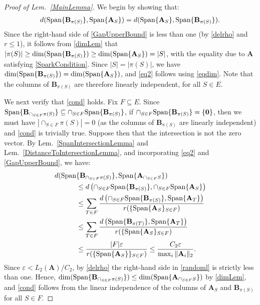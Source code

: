 \documentclass[9pt,twocolumn]{pnas-new}
\begin{document}
\begin{proof}[Proof of Lem.~\ref{MainLemma}]
We begin by showing that: 
\begin{align}\label{eq2}
d(\text{\rm Span}\{\mathbf{B}_{\pi(S)}\}, \text{\rm Span}\{\mathbf{A}_S\} ) = d(\text{\rm Span}\{\mathbf{A}_S\}, \text{\rm Span}\{\mathbf{B}_{\pi(S)}\}).
\end{align}
Since the right-hand side of \eqref{GapUpperBound} is less than one (by \eqref{delrho} and $r \leq 1$), it follows from \eqref{dimLem} that $|\pi(S)| \geq \dim(\text{\rm Span}\{\mathbf{B}_{\pi(S)}\}) \geq \dim(\text{\rm Span}\{\mathbf{A}_{S}\}) = |S|$, with the equality due to $\mathbf{A}$ satisfying \eqref{SparkCondition}. Since $|S| = |\pi(S)|$, we have $\dim(\text{\rm Span}\{\mathbf{B}_{\pi(S)}\}) = \dim(\text{\rm Span}\{\mathbf{A}_{S}\})$, and \eqref{eq2} follows using \eqref{eqdim}. Note that the columns of $\mathbf{B}_{\pi(S)}$ are therefore linearly independent, for all $S \in E$.

We next verify that \eqref{cond} holds.  Fix $F \subseteq E$. Since $\text{\rm Span}\{\mathbf{B}_{\cap_{S \in F}\pi(S)}\} \subseteq \cap_{S \in F} \text{\rm Span}\{\mathbf{B}_{\pi(S)}\}$, if $\cap_{S \in F} \text{\rm Span}\{\mathbf{B}_{\pi(S)}\} = \{\textbf{0}\}$, then we must have $|\cap_{S \in F} \pi(S)| = 0$ (as the columns of $\mathbf{B}_{\pi(S)}$ are linearly independent) and \eqref{cond} is trivially true. Suppose then that the intersection is not the zero vector. By Lem.~\ref{SpanIntersectionLemma} and Lem.~\ref{DistanceToIntersectionLemma}, and incorporating \eqref{eq2} and \eqref{GapUpperBound}, we have:
\begin{align}\label{randoml}
d( \text{\rm Span}&\{\mathbf{B}_{\cap_{S \in F}\pi(S)}\}, \text{\rm Span}\{\mathbf{A}_{\cap_{S \in F} S}\}  ) \nonumber \\
&\leq d\left( \cap_{S \in F} \text{\rm Span}\{\mathbf{B}_{\pi(S)}\}, \cap_{S \in F} \text{\rm Span}\{\mathbf{A}_{S}\} \right) \nonumber \\
&\leq \sum_{T \in F} \frac{ d\left( \cap_{S \in F} \text{\rm Span}\{\mathbf{B}_{\pi(S)}\},\text{\rm Span}\{\mathbf{A}_{T}\} \right) }{ r( \{ \text{\rm Span}\{\mathbf{A}_{S}\}_{S \in F}) } \nonumber \\
&\leq \sum_{T \in F} \frac{ d\left( \text{\rm Span}\{\mathbf{B}_{\pi(T)}\},\text{\rm Span}\{\mathbf{A}_{T}\} \right) }{ r( \{ \text{\rm Span}\{\mathbf{A}_{S}\}_{S \in F}) }\nonumber \\
&\leq \frac{|F| \varepsilon}{r( \{ \text{\rm Span}\{\mathbf{A}_{S}\} \}_{S \in F})} 
\leq \frac{C_2 \varepsilon}{\max_i\|\mathbf{A}_i\|_2}. 
\end{align}
Since $\varepsilon < L_2(\mathbf{A}) / C_2$, by \eqref{delrho} the right-hand side in \eqref{randoml} is strictly less than one. Hence, $\dim(\text{\rm Span}\{\mathbf{B}_{\cap_{S \in F}\pi(S)}\}) \leq \dim(\text{\rm Span}\{\mathbf{A}_{\cap_{S \in F} S}\})$ by \eqref{dimLem}, and \eqref{cond} follows from the linear independence of the columns of $\mathbf{A}_{S}$ and $\mathbf{B}_{\pi(S)}$ for all $S \in F$.


\end{proof}
\end{document}
